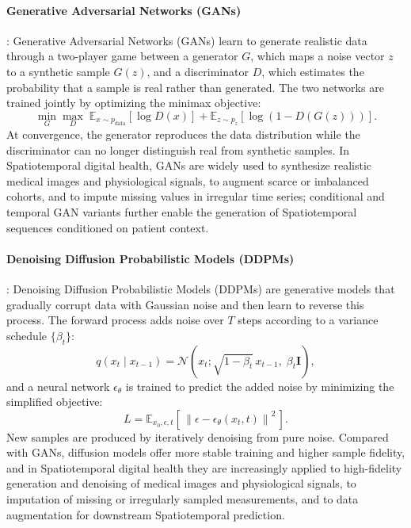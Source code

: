 \documentclass[acmsmall]{acmart}
\begin{document}
\paragraph{Generative Adversarial Networks (GANs)}: Generative Adversarial Networks (GANs) \cite{goodfellow2014gan} learn to generate realistic data through a two-player game between a generator $G$, which maps a noise vector $z$ to a synthetic sample $G(z)$, and a discriminator $D$, which estimates the probability that a sample is real rather than generated. The two networks are trained jointly by optimizing the minimax objective:
\begin{equation}
\min_G \max_D \; \mathbb{E}_{x \sim p_{\text{data}}}[\log D(x)] + \mathbb{E}_{z \sim p_z}[\log (1 - D(G(z)))].
\end{equation}
At convergence, the generator reproduces the data distribution while the discriminator can no longer distinguish real from synthetic samples. In Spatiotemporal digital health, GANs are widely used to synthesize realistic medical images and physiological signals, to augment scarce or imbalanced cohorts, and to impute missing values in irregular time series; conditional and temporal GAN variants further enable the generation of Spatiotemporal sequences conditioned on patient context.

\paragraph{Denoising Diffusion Probabilistic Models (DDPMs)}: Denoising Diffusion Probabilistic Models (DDPMs) \cite{ho2020ddpm} are generative models that gradually corrupt data with Gaussian noise and then learn to reverse this process. The forward process adds noise over $T$ steps according to a variance schedule $\{\beta_t\}$:
\begin{equation}
q(x_t \mid x_{t-1}) = \mathcal{N}\!\left(x_t; \sqrt{1-\beta_t}\, x_{t-1}, \; \beta_t \mathbf{I}\right),
\end{equation}
and a neural network $\epsilon_\theta$ is trained to predict the added noise by minimizing the simplified objective:
\begin{equation}
L = \mathbb{E}_{x_0, \epsilon, t}\!\left[\, \left\| \epsilon - \epsilon_\theta(x_t, t) \right\|^2 \,\right].
\end{equation}
New samples are produced by iteratively denoising from pure noise. Compared with GANs, diffusion models offer more stable training and higher sample fidelity, and in Spatiotemporal digital health they are increasingly applied to high-fidelity generation and denoising of medical images and physiological signals, to imputation of missing or irregularly sampled measurements, and to data augmentation for downstream Spatiotemporal prediction.
\end{document}

